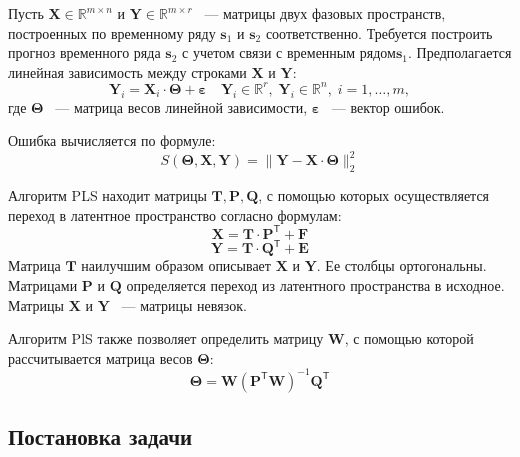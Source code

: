 \documentclass[12pt]{extarticle}
\newcommand{\bbr}{\mathbb{R}}
\begin{document}
Пусть $\mathbf{X}\in\bbr^{m\times n}$ и $\mathbf{Y}\in\bbr^{m\times r}$ ~--- матрицы двух фазовых пространств, построенных по временному ряду $\mathbf{s}_1$ и $\mathbf{s}_2$ соответственно. Требуется построить прогноз временного ряда $\mathbf{s}_2$ с учетом связи с временным рядом$\mathbf{s}_1$. Предполагается линейная зависимость между строками $\mathbf{X}$ и $\mathbf{Y}$:
\begin{equation}
    \mathbf{Y}_i = \mathbf{X}_i\cdot\mathbf{\Theta} + \mathbf{\varepsilon} \quad \mathbf{Y}_i\in\bbr^r,\;\mathbf{Y}_i\in\bbr^n,\; i = 1,\ldots,m,
    \label{eq:linear}
\end{equation}
где $\mathbf{\Theta}$ ~--- матрица весов линейной зависимости,\; $\mathbf{\varepsilon}$ ~--- вектор ошибок.

Ошибка вычисляется по формуле:
\begin{equation}
    S(\mathbf{\Theta}, \mathbf{X}, \mathbf{Y}) = \|\mathbf{Y} - \mathbf{X}\cdot\mathbf{\Theta}\|_2^2
    \label{eq:error}
\end{equation}

Алгоритм PLS находит матрицы $\mathbf{T}, \mathbf{P}, \mathbf{Q}$, с помощью которых осуществляется переход в латентное пространство согласно формулам:
\begin{equation}
    \mathbf{X} = \mathbf{T}\cdot \mathbf{P}^{\mathsf{T}} + \mathbf{F}
    \label{eq:latent_X}
\end{equation}
\begin{equation}
    \mathbf{Y} = \mathbf{T}\cdot \mathbf{Q}^{\mathsf{T}} + \mathbf{E}
    \label{eq:latent_Y}
\end{equation}
Матрица $\mathbf{T}$ наилучшим образом описывает $\mathbf{X}$ и $\mathbf{Y}$. Ее столбцы ортогональны. Матрицами $\mathbf{P}$ и $\mathbf{Q}$ определяется переход из латентного пространства в исходное. Матрицы $\mathbf{X}$ и $\mathbf{Y}$ ~--- матрицы невязок.

Алгоритм PlS также позволяет определить матрицу $\mathbf{W}$, с помощью которой рассчитывается матрица весов $\mathbf{\Theta}$:
\begin{equation}
    \mathbf{\Theta} = \mathbf{W}(\mathbf{P}^{\mathsf{T}}\mathbf{W})^{-1}\mathbf{Q}^{\mathsf{T}}
    \label{eq:Q}
\end{equation}

\subsection{Постановка задачи}
\end{document}
